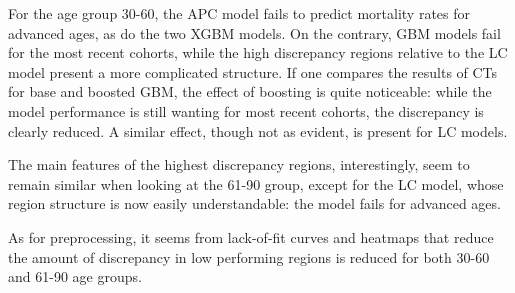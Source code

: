 \documentclass[fleqn,10pt]{wlscirep}
\begin{document}
For the age group 30-60, the APC model fails to predict mortality rates for advanced ages, as do the two XGBM models. On the contrary, GBM models fail for the most recent cohorts, while the high discrepancy regions relative to the LC model present a more complicated structure. 
If one compares the results of CTs for base and boosted GBM, the effect of boosting is quite noticeable: while the model performance is still wanting for most recent cohorts, the discrepancy is clearly reduced. A similar effect, though not as evident, is present for LC models.

The main features of the highest discrepancy regions, interestingly, seem to remain similar when looking at the 61-90 group, except for the LC model, whose region structure is now easily understandable: the model fails for advanced ages.

As for preprocessing, it seems from lack-of-fit curves and heatmaps that reduce the amount of discrepancy in low performing regions is reduced for both 30-60 and 61-90 age groups.
\end{document}
